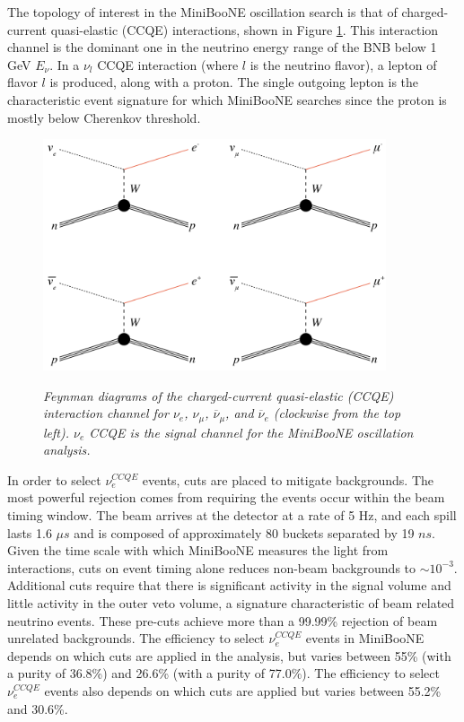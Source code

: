 The topology of interest in the MiniBooNE oscillation search is that of charged-current quasi-elastic (CCQE) interactions, shown in Figure \ref{georgia_ccqe_feynman_fig}. This interaction channel is the dominant one in the neutrino energy range of the BNB below 1 GeV $E_\nu$. In a $\nu_l$ CCQE interaction (where $l$ is the neutrino flavor), a lepton of flavor $l$ is produced, along with a proton. The single outgoing lepton is the characteristic event signature for which MiniBooNE searches since the proton is mostly below Cherenkov threshold.\\


\begin{figure}[ht!]
\centering
	\includegraphics[width=0.9\textwidth]{Figures/georgia_ccqe_feynman.png} \\
\caption{\textit{Feynman diagrams of the charged-current quasi-elastic (CCQE) interaction channel for $\nu_e$, $\nu_\mu$, $\overline{\nu}_\mu$, and $\overline{\nu}_e$ (clockwise from the top left). $\nu_e$ CCQE is the signal channel for the MiniBooNE oscillation analysis.}}\label{georgia_ccqe_feynman_fig}
\end{figure}

In order to select $\nu_e^{CCQE}$ events, cuts are placed to mitigate backgrounds. The most powerful rejection comes from requiring the events occur within the beam timing window. The beam arrives at the detector at a rate of 5 Hz, and each spill lasts 1.6 $\mu s$ and is composed of approximately 80 buckets separated by 19 $ns$. Given the time scale with which MiniBooNE measures the light from interactions, cuts on event timing alone reduces non-beam backgrounds to $\sim10^{-3}$. Additional cuts require that there is significant activity in the signal volume and little activity in the outer veto volume, a signature characteristic of beam related neutrino events. These pre-cuts achieve more than a 99.99\% rejection of beam unrelated backgrounds. The efficiency to select $\nu_e^{CCQE}$ events in MiniBooNE depends on which cuts are applied in the analysis, but varies between 55\% (with a purity of 36.8\%) and 26.6\% (with a purity of 77.0\%)\cite{MB_numueff_source}. The efficiency to select $\nu_e^{CCQE}$ events also depends on which cuts are applied but varies between 55.2\% and 30.6\%\cite{MB_nueeff_source}.\\

